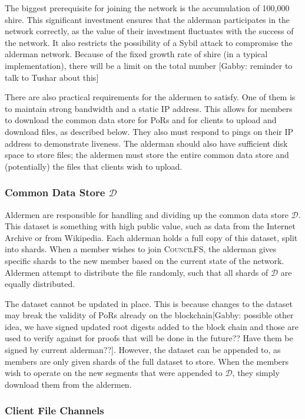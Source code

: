 \documentclass{article}
\begin{document}
The biggest prerequisite for joining the network is the accumulation of 100,000
shire. This significant investment ensures that the alderman participates in the
network correctly, as the value of their investment fluctuates with the success
of the network. It also restricts the possibility of a Sybil attack to
compromise the alderman network. Because of the fixed growth rate of shire (in a
typical implementation), there will be a limit on the total number [Gabby: reminder to talk to Tushar about this]  

There are also practical requirements for the aldermen to satisfy. One of them
is to maintain strong bandwidth and a static IP address. This allows for members
to download the common data store for PoRs and for clients to upload and
download files, as described below. They also must respond to pings on their IP
address to demonstrate liveness. The alderman should also have sufficient disk
space to store files; the aldermen must store the entire common data store and
(potentially) the files that clients wish to upload.

\subsubsection{Common Data Store $\mathcal{D}$}

Aldermen are responsible for handling and dividing up the common data store
$\mathcal{D}$. This dataset is something with high public value, such as data
from the Internet Archive or from Wikipedia. Each alderman holds a full copy of
this dataset, split into shards. When a member wishes to join
\textsc{CouncilFS}, the alderman gives specific shards to the new member based
on the current state of the network. Aldermen attempt to distribute the file
randomly, such that all shards of $\mathcal{D}$ are equally distributed.

The dataset cannot be updated in place. This is because changes to the dataset
may break the validity of PoRs already on the blockchain[Gabby: possible other idea, we have signed updated root digests added to the block chain and those are used to verify against for proofs that will be done in the future?? Have them be signed by current alderman??]. However, the dataset
can be appended to, as members are only given shards of the full dataset to
store. When the members wish to operate on the new segments that were appended
to $\mathcal{D}$, they simply download them from the aldermen.

\subsubsection{Client File Channels}
\end{document}
